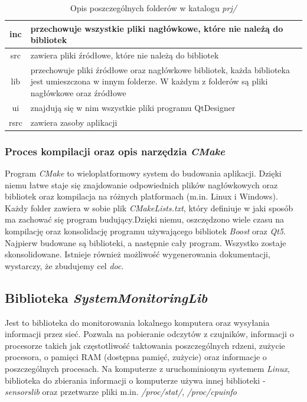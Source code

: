 \documentclass[a4paper]{article}
\begin{document}
\begin{table}
\centering
\begin{tabularx}{0.7\linewidth}{|c|X|}
	\hline
	inc & przechowuje wszystkie pliki nagłówkowe, które nie należą do bibliotek \\ \hline
	src & zawiera pliki źródłowe, które nie należą do bibliotek \\ \hline
	lib & przechowuje pliki źródłowe oraz nagłówkowe bibliotek, każda biblioteka jest umieszczona 
		  w innym folderze. W każdym z folderów są pliki nagłówkowe oraz źródłowe \\ \hline
	ui & znajdują się w nim wszystkie pliki  programu QtDesigner \\ \hline
	rsrc  & zawiera zasoby aplikacji \\ \hline
\end{tabularx}
\caption{Opis poszczególnych folderów w katalogu \textit{prj/}}
\label{opis_folderow_prj}
\end{table}

\subsubsection{Proces kompilacji oraz opis narzędzia \textit{CMake}}
Program \textit{CMake} to wieloplatformowy system do budowania aplikacji. Dzięki niemu łatwe staje się
znajdowanie odpowiednich plików nagłówkowych oraz bibliotek oraz kompilacja na różnych platformach (m.in. Linux i Windows). Każdy folder zawiera w sobie plik \textit{CMakeLists.txt}, który definiuje w jaki sposób ma zachować się program budujący.Dzięki niemu, oszczędzono wiele czasu na kompilację oraz konsolidację programu używającego bibliotek \textit{Boost} oraz \textit{Qt5}. Najpierw budowane są biblioteki, a następnie cały program. Wszystko zostaje skonsolidowane. Istnieje również możliwość wygenerowania dokumentacji, wystarczy, że zbudujemy cel \textit{doc}.

\subsection{Biblioteka \textit{SystemMonitoringLib}}
Jest to biblioteka do monitorowania lokalnego komputera oraz wysyłania informacji przez sieć. Pozwala na pobieranie odczytów z czujników, informacji o procesorze takich jak częstotliwość taktowania poszczególnych rdzeni, zużycie procesora, o pamięci RAM (dostępna pamięć, zużycie) oraz informacje o poszczególnych procesach. Na komputerze z uruchominionym systemem \textit{Linux}, biblioteka do zbierania informacji o komputerze używa innej biblioteki - \textit{sensorslib} oraz przetwarze pliki m.in. \textit{/proc/stat/}, \textit{/proc/cpuinfo}
\end{document}
